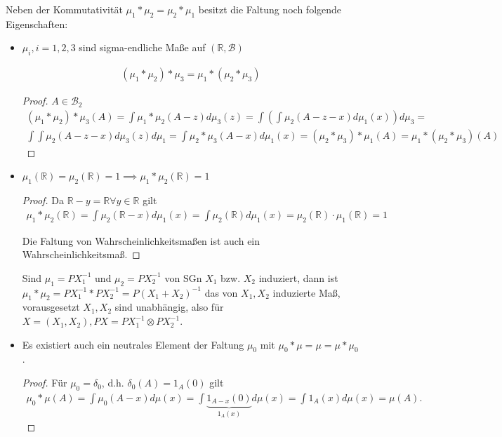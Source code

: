 \documentclass[]{article}
\begin{document}
Neben der Kommutativität $\mu_1 * \mu_2 = \mu_2 * \mu_1$ besitzt die Faltung noch folgende Eigenschaften:
\begin{itemize}
	\item $\mu_i, i=1,2,3$ sind sigma-endliche Maße auf $(\mathbb{R}, \mathcal{B})$
	
	\begin{align*}
		(\mu_1*\mu_2)* \mu_3 = \mu_1 * (\mu_2 * \mu_3)
	\end{align*}
	\begin{proof}
		$A \in \mathcal{B}_2$
		\begin{align*}
			(\mu_1 * \mu_2) * \mu_3(A) = \int \mu_1 * \mu_2 (A-z) d\mu_3(z) = \int\left(\int \mu_2(A-z-x) d\mu_1(x)\right) d\mu_3 = \\
			\int\int \mu_2(A-z-x) d\mu_3(z) d\mu_1 = \int \mu_2 * \mu_3 (A-x) d\mu_1(x) = (\mu_2 * \mu_3) * \mu_1(A) = \mu_1 * (\mu_2 * \mu_3) (A)
		\end{align*}
	\end{proof}

	\item $\mu_1(\mathbb{R}) = \mu_2(\mathbb{R}) = 1 \implies \mu_1 * \mu_2(\mathbb{R}) = 1$
	
	\begin{proof}
		Da $\mathbb{R}-y=\mathbb{R} \forall y\in\mathbb{R}$ gilt
		\begin{align*}
			\mu_1 * \mu_2 (\mathbb{R}) = \int \mu_2(\mathbb{R}-x) d\mu_1(x) = \int \mu_2(\mathbb{R}) d\mu_1(x) = \mu_2(\mathbb{R}) \cdot \mu_1(\mathbb{R}) = 1
		\end{align*}
		
		Die Faltung von Wahrscheinlichkeitsmaßen ist auch ein Wahrscheinlichkeitsmaß.
	\end{proof}
	
	Sind $\mu_1 = PX_1^{-1}$ und $\mu_2=PX_2^{-1}$ von SGn $X_1$ bzw. $X_2$ induziert, dann ist $\mu_1 * \mu_2 = PX_1^{-1} * PX_2^{-1} = P(X_1+X_2)^{-1}$ das von $X_1,X_2$ induzierte Maß, vorausgesetzt $X_1,X_2$ sind unabhängig, also für $X=(X_1,X_2), PX = PX_1^{-1} \otimes PX_2^{-1}$.
	
	\item Es existiert auch ein neutrales Element der Faltung $\mu_0$ mit $\mu_0 * \mu = \mu = \mu * \mu_0$.
	
	\begin{proof}
		Für $\mu_0 = \delta_0$, d.h. $\delta_0(A) = 1_A(0)$ gilt
		\begin{align*}
			\mu_0 * \mu(A) = \int \mu_0(A-x) d\mu(x) = \int \underbrace{1_{A-x}(0)}_{1_A(x)} d\mu(x) = \int 1_A(x) d\mu(x) = \mu(A).
		\end{align*}
	\end{proof}
\end{itemize}
\end{document}
